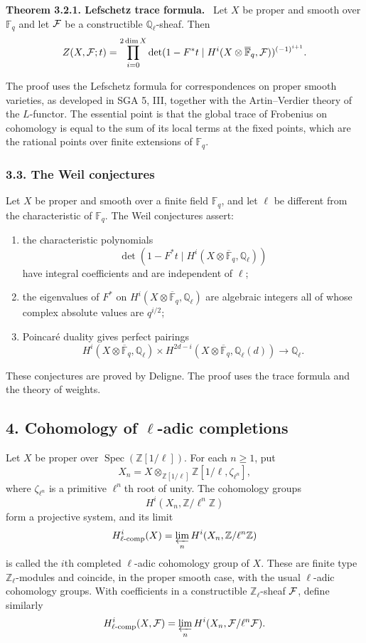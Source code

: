 \documentclass[11pt]{article}
\theoremstyle{plain}
\theoremstyle{definition}
\theoremstyle{remark}
\newenvironment{statement}[1]{\par\medskip\noindent\textbf{#1.}\ }{\par\medskip}
\newcommand{\bF}{\mathbb F}
\newcommand{\bQ}{\mathbb Q}
\newcommand{\bZ}{\mathbb Z}
\DeclareMathOperator{\Spec}{Spec}
\begin{document}
\begin{statement}{Theorem 3.2.1. Lefschetz trace formula}
Let $X$ be proper and smooth over $\bF_q$ and let $\mathcal F$ be a constructible
$\bQ_\ell$-sheaf. Then
\[
Z(X,\cF;t)=\prod_{i=0}^{2\dim X}
\det(1-F^*t\mid H^i(X\otimes\overline{\bF}_q,\cF))^{(-1)^{i+1}}.
\]
\end{statement}

The proof uses the Lefschetz formula for correspondences on proper smooth varieties,
as developed in SGA 5, III, together with the Artin--Verdier theory of the
$L$-functor. The essential point is that the global trace of Frobenius on
cohomology is equal to the sum of its local terms at the fixed points, which are the
rational points over finite extensions of $\bF_q$.

\subsubsection*{3.3. The Weil conjectures}

Let $X$ be proper and smooth over a finite field $\bF_q$, and let $\ell$ be different
from the characteristic of $\bF_q$. The Weil conjectures assert:
\begin{enumerate}[label=(\roman*)]
\item the characteristic polynomials
\[
   \det(1-F^*t\mid H^i(X\otimes\overline{\bF}_q,\bQ_\ell))
\]
have integral coefficients and are independent of $\ell$;
\item the eigenvalues of $F^*$ on $H^i(X\otimes\overline{\bF}_q,\bQ_\ell)$ are
algebraic integers all of whose complex absolute values are $q^{i/2}$;
\item Poincaré duality gives perfect pairings
\[
H^i(X\otimes\overline{\bF}_q,\bQ_\ell)\times
H^{2d-i}(X\otimes\overline{\bF}_q,\bQ_\ell(d))\longrightarrow \bQ_\ell.
\]
\end{enumerate}
These conjectures are proved by Deligne. The proof uses the trace formula and the
theory of weights.

\subsection*{4. Cohomology of $\ell$-adic completions}

Let $X$ be proper over $\Spec(\bZ[1/\ell])$. For each $n\ge1$, put
\[
      X_n=X\otimes_{\bZ[1/\ell]}\bZ[1/\ell,\zeta_{\ell^n}],
\]
where $\zeta_{\ell^n}$ is a primitive $\ell^n$th root of unity. The cohomology groups
\[
      H^i(X_n,\bZ/\ell^n\bZ)
\]
form a projective system, and its limit
\[
      H^i_{\ell\text{-}\mathrm{comp}}(X)=
      \varprojlim_n H^i(X_n,\bZ/\ell^n\bZ)
\]
is called the $i$th completed $\ell$-adic cohomology group of $X$. These are finite
type $\bZ_\ell$-modules and coincide, in the proper smooth case, with the usual
$\ell$-adic cohomology groups. With coefficients in a constructible
$\bZ_\ell$-sheaf $\mathcal F$, define similarly
\[
      H^i_{\ell\text{-}\mathrm{comp}}(X,\mathcal F)=
      \varprojlim_n H^i(X_n,\mathcal F/\ell^n\mathcal F).
\]
\end{document}
